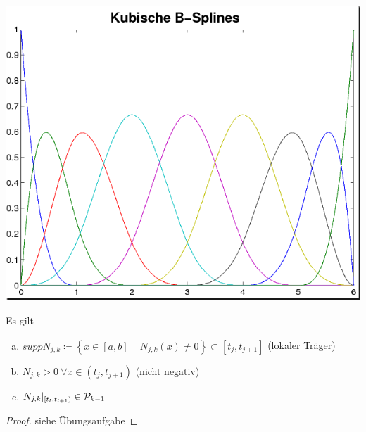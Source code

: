 \begin{image}{}
  \includegraphics[width=\linewidth]{images/kubBsplines.png}
\end{image}\label{6.2.6(3)}

\begin{Kore}
  Es gilt
  \begin{enumerate}[a)]
  \item $supp N_{j,k} \coloneqq 
    \overline{\left\{ x\in[a,b]\,\middle\vert
        \, N_{j,k}(x)\neq 0\right\}} \subset [t_j, t_{j+1}]$
    (lokaler Träger)
  \item $N_{j,k}>0 ~\forall x\in(t_j,t_{j+1})$ (nicht negativ)
  \item $N_{j,k}\vert_{[t_l,t_{l+1})}\in \mathcal{P}_{k-1}$
  \end{enumerate}

  \begin{proof}
    siehe Übungsaufgabe
  \end{proof}
\end{Kore}

